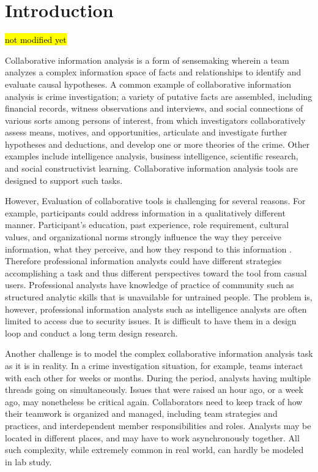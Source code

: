 \section{Introduction}
\hl{not modified yet}

Collaborative information analysis is a form of sensemaking wherein a team analyzes a complex information space of facts and relationships to identify and evaluate causal hypotheses. A common example of collaborative information analysis is crime investigation; a variety of putative facts are assembled, including financial records, witness observations and interviews, and social connections of various sorts among persons of interest, from which investigators collaboratively  assess means, motives, and opportunities, articulate and investigate further hypotheses and deductions, and develop one or more theories of the crime. Other examples include intelligence analysis, business intelligence, scientific research, and social constructivist learning. Collaborative information analysis tools are designed to support such tasks.

However, Evaluation of collaborative tools is challenging for several reasons. For example, participants could address information in a qualitatively different manner. Participant's education, past experience, role requirement, cultural values, and organizational norms strongly influence the way they perceive information, what they perceive, and how they respond to this information \cite{heuer1999}. Therefore professional information analysts could have different strategies accomplishing a task and thus different perspectives toward the tool from casual users. Professional analysts have knowledge of practice of community such as structured analytic skills that is unavailable for untrained people. The problem is, however, professional information analysts such as intelligence analysts are often limited to access due to security issues. It is difficult to have them in a design loop and conduct a long term design research. 

Another challenge is to model the complex collaborative information analysis task as it is in reality. In a crime investigation situation, for example, teams interact with each other for weeks or months. During the period, analysts having multiple threads going on simultaneously. Issues that were raised an hour ago, or a week ago, may nonetheless be critical again. Collaborators need to keep track of how their teamwork is organized and managed, including team strategies and practices, and interdependent member responsibilities and roles. Analysts may be located in different places, and may have to work asynchronously together. All such complexity, while extremely common in real world, can hardly be modeled in lab study.



